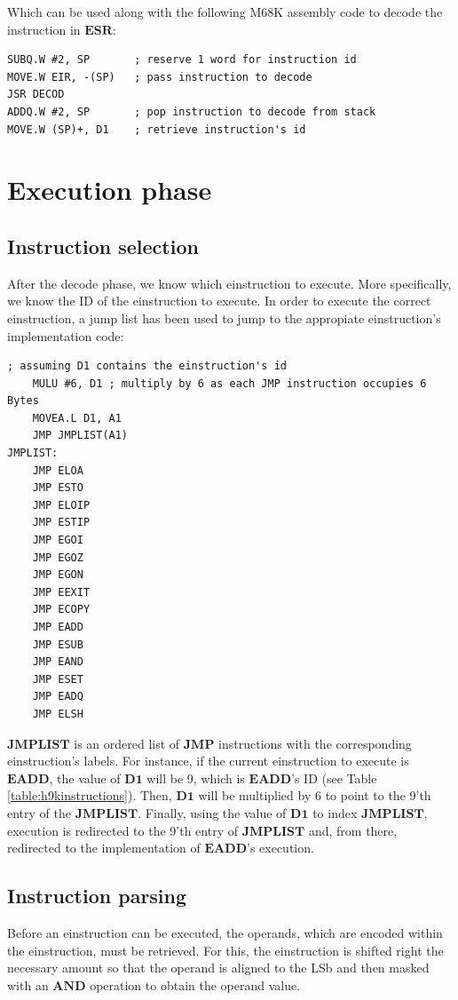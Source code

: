 \documentclass[11pt, a4paper]{article}
\begin{document}
Which can be used along with the following M68K assembly code to decode the instruction in
$\mathbf{ESR}$:
\begin{lstlisting}[style=customasm, caption={HAL9000 instruction decoder subroutine call}, label={code:h9kdecodercall}]
SUBQ.W #2, SP		; reserve 1 word for instruction id
MOVE.W EIR, -(SP)	; pass instruction to decode
JSR DECOD
ADDQ.W #2, SP		; pop instruction to decode from stack
MOVE.W (SP)+, D1	; retrieve instruction's id
\end{lstlisting}

\pagebreak
\section{Execution phase}
\subsection{Instruction selection}
After the decode phase, we know which einstruction to execute. More specifically, we know the ID of
the einstruction to execute. In order to execute the correct einstruction, a jump list has been used
to jump to the appropiate einstruction's implementation code:
\begin{lstlisting}[style=customasm, caption={HAL9000 instruction execution jump list}, label={code:h9kexcjmplst}]
	; assuming D1 contains the einstruction's id
	MULU #6, D1 ; multiply by 6 as each JMP instruction occupies 6 Bytes
	MOVEA.L D1, A1
	JMP JMPLIST(A1)
JMPLIST:
	JMP ELOA
	JMP ESTO
	JMP ELOIP
	JMP ESTIP
	JMP EGOI
	JMP EGOZ
	JMP EGON
	JMP EEXIT
	JMP ECOPY
	JMP EADD
	JMP ESUB
	JMP EAND
	JMP ESET
	JMP EADQ
	JMP ELSH
\end{lstlisting}

$\mathbf{JMPLIST}$ is an ordered list of $\mathbf{JMP}$ instructions with the corresponding
einstruction's labels. For instance, if the current einstruction to execute is $\mathbf{EADD}$, the
value of $\mathbf{D1}$ will be 9, which is $\mathbf{EADD}$'s ID (see Table
\ref{table:h9kinstructions}). Then, $\mathbf{D1}$ will be multiplied by 6 to point to the 9'th entry
of the $\mathbf{JMPLIST}$. Finally, using the value of $\mathbf{D1}$ to index $\mathbf{JMPLIST}$,
execution is redirected to the 9'th entry of $\mathbf{JMPLIST}$ and, from there, redirected to the
implementation of $\mathbf{EADD}$'s execution.

\subsection{Instruction parsing}
Before an einstruction can be executed, the operands, which are encoded within the einstruction,
must be retrieved. For this, the einstruction is shifted right the necessary amount so that the operand
is aligned to the LSb and then masked with an $\mathbf{AND}$ operation to obtain the operand value.
\end{document}
